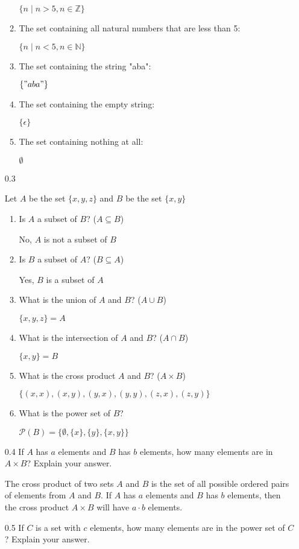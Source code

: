 \documentclass[12pt, a4paper]{article}
\begin{document}
\begin{enumerate}
\begin{enumerate}
    $\{n \mid n > 5, n \in \mathbb{Z}\}$
\item  The set containing all natural numbers that are less than 5:

    $\{n \mid n < 5, n \in \mathbb{N}\}$
\item The set containing the string "aba":

    $\{"aba"\}$
\item The set containing the empty string:

    $\{\epsilon\}$
\item The set containing nothing at all:

    $\emptyset$
\end{enumerate}

    \item[0.3]

Let $A$ be the set $\{x,y,z\}$ and $B$ be the set $\{x,y\}$
\begin{enumerate}
\item Is $A$ a subset of $B$? ($A \subseteq B$) 

    No, $A$ is not a subset of $B$
\item Is $B$ a subset of $A$? ($B \subseteq A$) 

    Yes, $B$ is a subset of $A$
\item What is the union of $A$ and $B$? ($A \cup B$) 

    $\{x,y,z\} = A$
\item What is the intersection of $A$ and $B$? ($A \cap B$) 

    $\{x,y\} = B$
\item What is the cross product $A$ and $B$? ($A \times B$) 

    $\{(x,x), (x,y), (y,x), (y,y), (z,x), (z,y)\}$

\item What is the power set of $B$? 

$\mathcal{P}(B) = \{\emptyset, \{x\}, \{y\}, \{x,y\}\}$
\end{enumerate}

    \item[0.4]
If $A$ has  $a$  elements and  $B$  has  $b$  elements, how many elements are in  $A \times B$? 
Explain your answer.

The cross product of two sets $A$ and $B$ is the set of all possible ordered pairs of elements from $A$ and $B$. If $A$ has $a$ elements and $B$ has $b$ elements, then the cross product $A \times B$ will have $a \cdot b$ elements.

    \item[0.5]
If $C$ is a set with $c$ elements, how many elements are in the power set of $C$? 
Explain your answer.


\end{enumerate}
\end{document}
